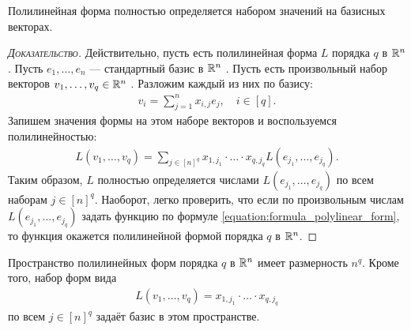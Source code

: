 \begin{claim*}
 Полилинейная форма полностью определяется набором значений на базисных векторах.
\end{claim*}
\begin{proof}[\normalfont\textsc{Доказательство}]
 Действительно, пусть есть полилинейная форма  $L$ порядка  $q$  в $\mathbb{R}^{n}$ . Пусть $e_1, \ldots, e_n$  --- стандартный базис в $\mathbb{R}^{n}$ . Пусть есть произвольный набор векторов $v_1, \ldots, v_q \in \mathbb{R}^{n}$ . Разложим каждый из них по базису:
 \begin{align*}
  v_i = \sum_{j=1}^{n} x_{i,j} e_j, \quad i \in [q]
 .\end{align*} Запишем значения формы на этом наборе векторов и воспользуемся полилинейностью:
 \begin{align}
  \label{equation:formula_polylinear_form}
  L(v_1, \ldots, v_q) = \sum_{j \in [n]^{q}} x_{1,j_1} \cdot \ldots \cdot x_{q, j_q} L(e_{j_1}, \ldots, e_{j_q})
 .\end{align} Таким образом, $L$ полностью определяется числами $L(e_{j_1}, \ldots, e_{j_q})$ по всем наборам $j \in [n]^{q}$.  Наоборот, легко проверить, что если по произвольным числам $L(e_{j_1}, \ldots, e_{j_q})$ задать функцию по формуле \eqref{equation:formula_polylinear_form}, то функция окажется полилинейной формой порядка $q$ в $\mathbb{R}^{n}$.
\end{proof}
\begin{crly*}
 Пространство полилинейных форм порядка $q$ в $\mathbb{R}^{n}$ имеет размерность $n^{q}$. Кроме того, набор форм вида
 \begin{align*}
  L(v_1,\ldots,v_q) = x_{1,j_1} \cdot \ldots \cdot x_{q,j_q}
 \end{align*} по всем $j \in [n]^{q}$ задаёт базис в этом пространстве.
\end{crly*}

